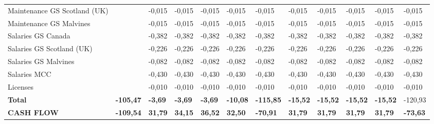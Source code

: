 \begin{landscape}
\begin{table}[]
{\begin{tabular}{| l |l|l|l|l|l|l|l|l|l|l|l|}
Maintenance GS Scotland (UK)                                                           &         & -0,015         & -0,015         & -0,015         & -0,015         & -0,015         & -0,015         & -0,015         & -0,015         & -0,015         & -0,015         \\
Maintenance GS Malvines                                                                &         & -0,015         & -0,015         & -0,015         & -0,015         & -0,015         & -0,015         & -0,015         & -0,015         & -0,015         & -0,015         \\
Salaries GS Canada                                                                     &         & -0,382         & -0,382         & -0,382         & -0,382         & -0,382         & -0,382         & -0,382         & -0,382         & -0,382         & -0,382         \\
Salaries GS Scotland (UK)                                                              &         & -0,226         & -0,226         & -0,226         & -0,226         & -0,226         & -0,226         & -0,226         & -0,226         & -0,226         & -0,226         \\
Salaries GS Malvines                                                                   &         & -0,082         & -0,082         & -0,082         & -0,082         & -0,082         & -0,082         & -0,082         & -0,082         & -0,082         & -0,082         \\
Salaries MCC                                                                           &         & -0,430         & -0,430         & -0,430         & -0,430         & -0,430         & -0,430         & -0,430         & -0,430         & -0,430         & -0,430         \\
Licenses                                                                               &         & -0,010         & -0,010         & -0,010         & -0,010         & -0,010         & -0,010         & -0,010         & -0,010         & -0,010         & -0,010         \\
\textbf{Total}                                                                         & \textbf{-105,47} & \textbf{-3,69}  & \textbf{-3,69}  & \textbf{-3,69}  & \textbf{-10,08} & \textbf{-115,85} & \textbf{-15,52} & \textbf{-15,52} & \textbf{-15,52} & \textbf{-15,52} & -120,93         
\\ \hline \hline
\rowcolor[gray]{0.85}
\textbf{CASH FLOW}                                                                     & \textbf{-109,54} & \textbf{31,79}  & \textbf{34,15}  & \textbf{36,52}  & \textbf{32,50}  & \textbf{-70,91}  & \textbf{31,79}  & \textbf{31,79}  & \textbf{31,79}  & \textbf{31,79}  & \textbf{-73,63} \\

\end{tabular}}
\end{table}
\end{landscape}
